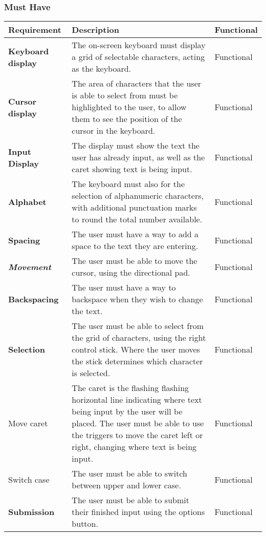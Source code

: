 \documentclass[requirements.tex]{subfiles}
\begin{document}
\subsubsection{Must Have} %
\label{ssub:after_must_have}
\begin{table}[H]
\small
\begin{tabularx}{\textwidth}{| l | X | l |}
 \hline
 \textbf{Requirement} & \textbf{Description} & \textbf{Functional} \\
 \hline
 \textbf{Keyboard display} & The on-screen keyboard must display a grid of
 selectable characters, acting as the keyboard. & Functional \\
 \hline
 \textbf{Cursor display} & The area of characters that the user is able to
 select from must be highlighted to the user, to allow them to see the position
 of the cursor in the keyboard. & Functional \\
 \hline
 \textbf{Input Display} & The display must show the text the user has already
 input, as well as the caret showing text is being input. & Functional \\
 \hline
 \textbf{Alphabet} & The keyboard must also for the selection of alphanumeric
 characters, with additional punctuation marks to round the total number
 available. & Functional \\
 \hline
 \textbf{Spacing} & The user must have a way to add a space to the text they are
 entering. & Functional \\
 \hline
 \textbf{\emph{Movement}} & The user must be able to move the cursor, using the
 directional pad. & Functional \\
 \hline
 \textbf{Backspacing} & The user must have a way to backspace when they wish to
 change the text. & Functional \\
 \hline
 \textbf{Selection} & The user must be able to select from the grid of
 characters, using the right control stick. Where the user moves the stick
 determines which character is selected. & Functional \\
 \hline
 Move caret & The caret is the flashing flashing horizontal line indicating
 where text being input by the user will be placed. The user must be able to use
 the triggers to move the caret left or right, changing where text is being 
 input. & Functional \\
 \hline
 Switch case & The user must be able to switch between upper and lower case.
 & Functional \\
 \hline
 \textbf{Submission} & The user must be able to submit their finished input
 using the options button. & Functional \\
 \hline
\end{tabularx}
\end{table}
\end{document}
